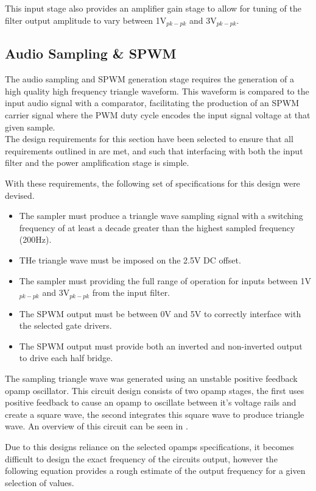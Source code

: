 \documentclass[a4paper,11pt]{article}
\begin{document}
This input stage also provides an amplifier gain stage to allow for tuning of the filter output amplitude to vary between 1V$_{pk-pk}$ and 3V$_{pk-pk}$.   

\subsection{Audio Sampling \& SPWM}

The audio sampling and SPWM generation stage requires the generation of a high quality high frequency triangle waveform. This waveform is compared to the input audio signal with a comparator, facilitating the production of an SPWM carrier signal where the PWM duty cycle encodes the input signal voltage at that given sample.\\

The design requirements for this section have been selected to ensure that all requirements outlined in  are met, and such that interfacing with both the input filter and the power amplification stage is simple.  

With these requirements, the following set of specifications for this design were devised. 
\begin{itemize}
    \item  The sampler must produce a triangle wave sampling signal with a switching frequency of at least a decade greater than the highest sampled frequency (200Hz).
    \item THe triangle wave must be imposed on the 2.5V DC offset.
    \item The sampler must providing the full range of operation for inputs between 1V$_{pk-pk}$ and 3V$_{pk-pk}$ from the input filter.
    \item The SPWM output must be between 0V and 5V to correctly interface with the selected gate drivers.
    \item The SPWM output must provide both an inverted and non-inverted output to drive each half bridge.
\end{itemize}

The sampling triangle wave was generated using an unstable positive feedback opamp oscillator. This circuit design consists of two opamp stages, the first uses positive feedback to cause an opamp to oscillate between it's voltage rails and create a square wave, the second integrates this square wave to produce triangle wave. An overview of this circuit can be seen in .

Due to this designs reliance on the selected opamps specifications, it becomes difficult to design the exact frequency of the circuits output, however the following equation provides a rough estimate of the output frequency for a given selection of values. 
\end{document}
